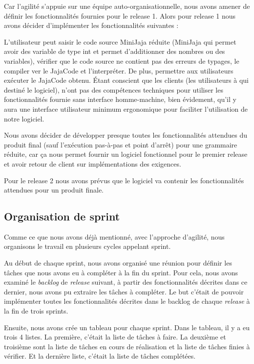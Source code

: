 \documentclass[a4paper,12pt]{article}
\begin{document}
Car l'agilité s'appuie sur une équipe auto-organisationnelle, nous avons amener de définir les fonctionnalités fournies pour le release 1.  Alors pour release 1 nous avons décider  d'implémenter les fonctionnalités suivantes :

L'utilisateur peut saisir le code source MiniJaja réduite (MiniJaja qui permet avoir des variable de type int et permet d'additionner des nombres ou des variables), vérifier que le code source ne contient pas des erreurs de typages, le compiler ver le JajaCode et l'interpréter. De plus, permettre aux utilisateurs exécuter le JajaCode obtenu. Étant conscient que les clients (les utilisateurs à qui destiné le logiciel), n'ont pas des compétences techniques pour utiliser les fonctionnalités fournie sans interface homme-machine, bien évidement, qu'il y aura une interface utilisateur minimum ergonomique pour faciliter l'utilisation de notre logiciel.
 
Nous avons décider de développer presque toutes les fonctionnalités attendues du produit final (sauf l'exécution pas-à-pas et point d'arrêt) pour une grammaire réduite, car ça nous permet fournir un logiciel fonctionnel pour le premier release et avoir retour de client sur implémentations des exigences.  

Pour le release 2 nous avons prévus que le logiciel va contenir les fonctionnalités attendues pour un produit finale. 

\subsection{Organisation de sprint}
Comme ce que nous avons déjà mentionné, avec l'approche d'agilité, nous organisons le travail en plusieurs cycles appelant sprint. 

Au début de chaque sprint, nous avons organisé une réunion pour définir les tâches que nous avons eu à compléter à la fin du sprint. Pour cela, nous avons examiné le \textit{backlog} de \textit{release} suivant, à partir des fonctionnalités décrites dans ce dernier, nous avons pu extraire les tâches à compléter. Le but c'était de pouvoir implémenter toutes les fonctionnalités décrites dans le backlog de chaque \textit{release} à la fin de trois sprints.

Ensuite, nous avons crée un tableau pour chaque sprint. Dans le tableau, il y a eu trois 4 listes. La première, c'était la liste de tâches à faire. La deuxième et troisième sont la liste de tâches en cours de réalisation et la liste de tâches finies à vérifier. Et la dernière liste, c'était la liste de tâches complétées.
\end{document}
